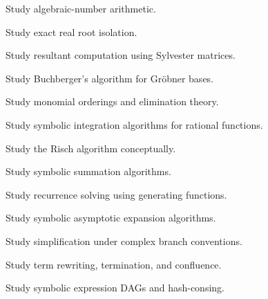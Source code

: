 \begin{exercise}[4]
Study algebraic-number arithmetic.
\end{exercise}

\begin{exercise}[4]
Study exact real root isolation.
\end{exercise}

\begin{exercise}[4]
Study resultant computation using Sylvester matrices.
\end{exercise}

\begin{exercise}[4]
Study Buchberger's algorithm for Gröbner bases.
\end{exercise}

\begin{exercise}[4]
Study monomial orderings and elimination theory.
\end{exercise}

\begin{exercise}[4]
Study symbolic integration algorithms for rational functions.
\end{exercise}

\begin{exercise}[4]
Study the Risch algorithm conceptually.
\end{exercise}

\begin{exercise}[4]
Study symbolic summation algorithms.
\end{exercise}

\begin{exercise}[4]
Study recurrence solving using generating functions.
\end{exercise}

\begin{exercise}[4]
Study symbolic asymptotic expansion algorithms.
\end{exercise}

\begin{exercise}[4]
Study simplification under complex branch conventions.
\end{exercise}

\begin{exercise}[4]
Study term rewriting, termination, and confluence.
\end{exercise}

\begin{exercise}[4]
Study symbolic expression DAGs and hash-consing.
\end{exercise}

